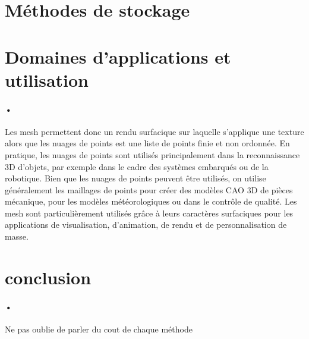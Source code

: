 \section{Méthodes de stockage}
\section{Domaines d'applications et utilisation}
\paragraph{•} Les mesh permettent donc un rendu surfacique sur laquelle s'applique une texture alors que les nuages de points est une liste de points finie et non ordonnée.
En pratique, les nuages de points sont utilisés principalement dans la reconnaissance 3D d'objets, par exemple dans le cadre des systèmes embarqués ou de la robotique. Bien que les nuages de points peuvent être utilisés, on utilise généralement les maillages de points pour créer des modèles CAO 3D de pièces mécanique, pour les modèles météorologiques ou dans le contrôle de qualité. Les mesh sont particulièrement utilisés grâce à leurs caractères surfaciques pour les applications de visualisation, d'animation, de rendu et de personnalisation de masse.

\section{conclusion}
\paragraph{•} Ne pas oublie de parler du cout de chaque méthode